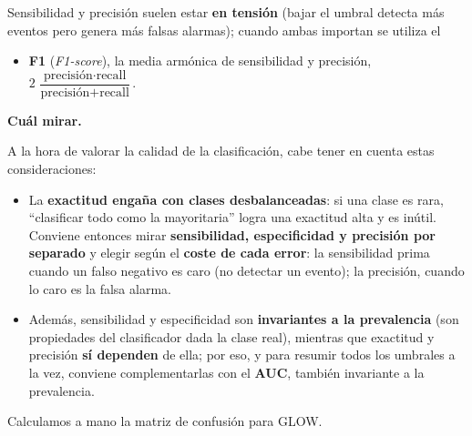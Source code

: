\documentclass[
  letterpaper,
  DIV=11,
  numbers=noendperiod]{scrartcl}
\newenvironment{Shaded}{\begin{snugshade}}{\end{snugshade}}
\newcommand{\AttributeTok}[1]{\textcolor[rgb]{0.40,0.45,0.13}{#1}}
\newcommand{\CommentTok}[1]{\textcolor[rgb]{0.37,0.37,0.37}{#1}}
\newcommand{\FloatTok}[1]{\textcolor[rgb]{0.68,0.00,0.00}{#1}}
\newcommand{\FunctionTok}[1]{\textcolor[rgb]{0.28,0.35,0.67}{#1}}
\newcommand{\NormalTok}[1]{\textcolor[rgb]{0.00,0.23,0.31}{#1}}
\newcommand{\OtherTok}[1]{\textcolor[rgb]{0.00,0.23,0.31}{#1}}
\newcommand{\SpecialCharTok}[1]{\textcolor[rgb]{0.37,0.37,0.37}{#1}}
\newcommand{\StringTok}[1]{\textcolor[rgb]{0.13,0.47,0.30}{#1}}
\providecommand{\tightlist}{%
  \setlength{\itemsep}{0pt}\setlength{\parskip}{0pt}}\usepackage{longtable,booktabs,array}
\begin{document}
Sensibilidad y precisión suelen estar \textbf{en tensión} (bajar el
umbral detecta más eventos pero genera más falsas alarmas); cuando ambas
importan se utiliza el

\begin{itemize}
\tightlist
\item
  \textbf{F1} (\emph{F1-score}), la media armónica de sensibilidad y
  precisión,
  \(2\,\dfrac{\text{precisión}\cdot\text{recall}}{\text{precisión}+\text{recall}}\).
\end{itemize}

\textbf{Cuál mirar.}

A la hora de valorar la calidad de la clasificación, cabe tener en
cuenta estas consideraciones:

\begin{itemize}
\tightlist
\item
  La \textbf{exactitud engaña con clases desbalanceadas}: si una clase
  es rara, ``clasificar todo como la mayoritaria'' logra una exactitud
  alta y es inútil. Conviene entonces mirar \textbf{sensibilidad,
  especificidad y precisión por separado} y elegir según el
  \textbf{coste de cada error}: la sensibilidad prima cuando un falso
  negativo es caro (no detectar un evento); la precisión, cuando lo caro
  es la falsa alarma.
\item
  Además, sensibilidad y especificidad son \textbf{invariantes a la
  prevalencia} (son propiedades del clasificador dada la clase real),
  mientras que exactitud y precisión \textbf{sí dependen} de ella; por
  eso, y para resumir todos los umbrales a la vez, conviene
  complementarlas con el \textbf{AUC}, también invariante a la
  prevalencia.
\end{itemize}

Calculamos a mano la matriz de confusión para GLOW.

\begin{Shaded}
\end{Shaded}
\end{document}
